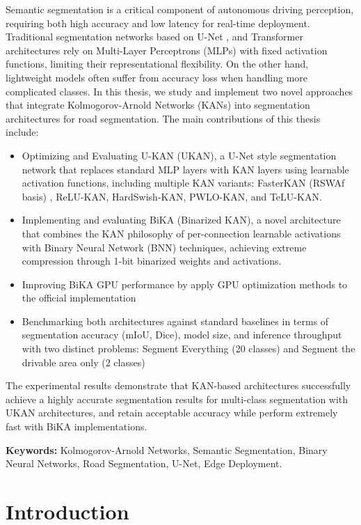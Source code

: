 \documentclass[a4paper]{report}
\begin{document}
Semantic segmentation is a critical component of autonomous driving perception, requiring both high accuracy and low latency for real-time deployment. Traditional segmentation networks based on U-Net \cite{ronneberger2015unet},  and Transformer architectures rely on Multi-Layer Perceptrons (MLPs) with fixed activation functions, limiting their representational flexibility. On the other hand, lightweight models often suffer from accuracy loss when handling more complicated classes.
In this thesis, we study and implement two novel approaches that integrate Kolmogorov-Arnold Networks (KANs) into segmentation architectures for road segmentation. The main contributions of this thesis include:
\begin{itemize}
    \item Optimizing and Evaluating U-KAN (UKAN), a U-Net style segmentation network that replaces standard MLP layers with KAN layers using learnable activation functions, including multiple KAN variants: FasterKAN (RSWAf basis) , ReLU-KAN, HardSwish-KAN, PWLO-KAN, and TeLU-KAN.
    \item Implementing and evaluating BiKA (Binarized KAN), a novel architecture that combines the KAN philosophy of per-connection learnable activations with Binary Neural Network (BNN) techniques, achieving extreme compression through 1-bit binarized weights and activations.
    \item Improving BiKA \cite{liu2026bika} GPU performance by apply GPU optimization methods to the official implementation
    \item Benchmarking both architectures against standard baselines in terms of segmentation accuracy (mIoU, Dice), model size, and inference throughput with two distinct problems: Segment Everything (20 classes) and Segment the drivable area only (2 classes)
  \end{itemize}

The experimental results demonstrate that KAN-based architectures successfully achieve a highly accurate segmentation results for multi-class segmentation with UKAN architectures, and retain acceptable accuracy while perform extremely fast with BiKA implementations.

\textbf{Keywords:} Kolmogorov-Arnold Networks, Semantic Segmentation, Binary Neural Networks, Road Segmentation, U-Net, Edge Deployment.

\clearpage
{}
\setcounter{page}{1}
\chapter{Introduction}
\end{document}

